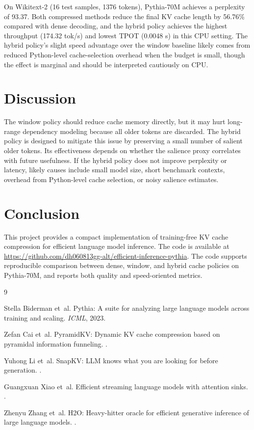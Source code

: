 \documentclass{article}
\begin{document}
On Wikitext-2 (16 test samples, 1376 tokens), Pythia-70M achieves a perplexity of 93.37. Both compressed methods reduce the final KV cache length by 56.76\% compared with dense decoding, and the hybrid policy achieves the highest throughput (174.32 tok/s) and lowest TPOT (0.0048 s) in this CPU setting. The hybrid policy's slight speed advantage over the window baseline likely comes from reduced Python-level cache-selection overhead when the budget is small, though the effect is marginal and should be interpreted cautiously on CPU.

\section{Discussion}
The window policy should reduce cache memory directly, but it may hurt long-range dependency modeling because all older tokens are discarded. The hybrid policy is designed to mitigate this issue by preserving a small number of salient older tokens. Its effectiveness depends on whether the salience proxy correlates with future usefulness. If the hybrid policy does not improve perplexity or latency, likely causes include small model size, short benchmark contexts, overhead from Python-level cache selection, or noisy salience estimates.

\section{Conclusion}
This project provides a compact implementation of training-free KV cache compression for efficient language model inference. The code is available at \url{https://github.com/dh060813gg-alt/efficient-inference-pythia}. The code supports reproducible comparison between dense, window, and hybrid cache policies on Pythia-70M, and reports both quality and speed-oriented metrics.

\begin{thebibliography}{9}

Stella Biderman et~al.
\newblock Pythia: A suite for analyzing large language models across training and scaling.
\newblock \emph{ICML}, 2023.

Zefan Cai et~al.
\newblock PyramidKV: Dynamic KV cache compression based on pyramidal information funneling.
.

Yuhong Li et~al.
\newblock SnapKV: LLM knows what you are looking for before generation.
.

Guangxuan Xiao et~al.
\newblock Efficient streaming language models with attention sinks.
.

Zhenyu Zhang et~al.
\newblock H2O: Heavy-hitter oracle for efficient generative inference of large language models.
.

\end{thebibliography}
\end{document}
